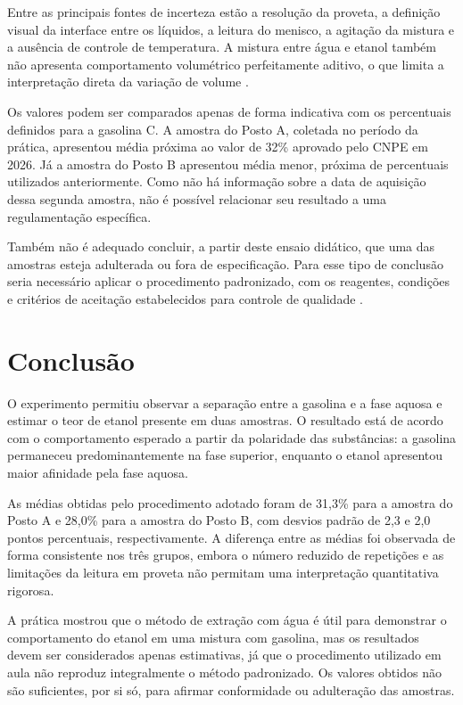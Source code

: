 \documentclass[11pt]{ifscarticle}
\begin{document}
Entre as principais fontes de incerteza estão a resolução da proveta, a definição visual da interface entre os líquidos, a leitura do menisco, a agitação da mistura e a ausência de controle de temperatura. A mistura entre água e etanol também não apresenta comportamento volumétrico perfeitamente aditivo, o que limita a interpretação direta da variação de volume \cite{atkins2012}.

Os valores podem ser comparados apenas de forma indicativa com os percentuais definidos para a gasolina C. A amostra do Posto A, coletada no período da prática, apresentou média próxima ao valor de 32\% aprovado pelo CNPE em 2026. Já a amostra do Posto B apresentou média menor, próxima de percentuais utilizados anteriormente. Como não há informação sobre a data de aquisição dessa segunda amostra, não é possível relacionar seu resultado a uma regulamentação específica.

Também não é adequado concluir, a partir deste ensaio didático, que uma das amostras esteja adulterada ou fora de especificação. Para esse tipo de conclusão seria necessário aplicar o procedimento padronizado, com os reagentes, condições e critérios de aceitação estabelecidos para controle de qualidade \cite{nbr13992}.

\section{Conclusão}

O experimento permitiu observar a separação entre a gasolina e a fase aquosa e estimar o teor de etanol presente em duas amostras. O resultado está de acordo com o comportamento esperado a partir da polaridade das substâncias: a gasolina permaneceu predominantemente na fase superior, enquanto o etanol apresentou maior afinidade pela fase aquosa.

As médias obtidas pelo procedimento adotado foram de 31,3\% para a amostra do Posto A e 28,0\% para a amostra do Posto B, com desvios padrão de 2,3 e 2,0 pontos percentuais, respectivamente. A diferença entre as médias foi observada de forma consistente nos três grupos, embora o número reduzido de repetições e as limitações da leitura em proveta não permitam uma interpretação quantitativa rigorosa.

A prática mostrou que o método de extração com água é útil para demonstrar o comportamento do etanol em uma mistura com gasolina, mas os resultados devem ser considerados apenas estimativas, já que o procedimento utilizado em aula não reproduz integralmente o método padronizado. Os valores obtidos não são suficientes, por si só, para afirmar conformidade ou adulteração das amostras.

\clearpage

\end{document}
